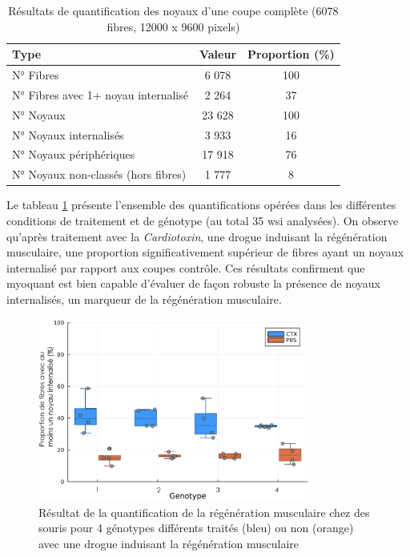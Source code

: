 \begin{table}[htbp]
\centering
\caption{Résultats de quantification des noyaux d'une coupe complète (6078 fibres, 12000 x 9600 pixels)}
\label{tab:myoquant_fluo_results}
\begin{tabular}{|l|c|c|}
\hline
\textbf{Type} & \textbf{Valeur} & \textbf{Proportion (\%)} \\
\hline
N° Fibres & 6 078 & 100 \\
\hline
N° Fibres avec 1+ noyau internalisé & 2 264 & 37 \\
\hline
\hline
N° Noyaux & 23 628 & 100 \\
\hline
N° Noyaux internalisés & 3 933 & 16 \\
\hline
N° Noyaux périphériques & 17 918 & 76 \\
\hline
N° Noyaux non-classés (hors fibres) & 1 777 & 8 \\
\hline
\end{tabular}
\end{table}
Le tableau \ref{fig:fluo_compil} présente l'ensemble des quantifications opérées dans les différentes conditions de traitement et de génotype (au total 35 \gls{wsi} analysées). On observe qu'après traitement avec la \textit{Cardiotoxin}, une drogue induisant la régénération musculaire, une proportion significativement supérieur de fibres ayant un noyaux internalisé par rapport aux coupes contrôle. Ces résultats confirment que \gls{myoquant} est bien capable d'évaluer de façon robuste la présence de noyaux internalisés, un marqueur de la régénération musculaire.

\begin{figure}[htbp]
 \centering
 \includegraphics[width=0.8\textwidth]{figures/fluo_compil.png}
 \caption[Résultat de la quantification de la régénération musculaire]{Résultat de la quantification de la régénération musculaire chez des souris pour 4 génotypes différents traités (bleu) ou non (orange) avec une drogue induisant la régénération musculaire}
 \label{fig:fluo_compil}
\end{figure}

